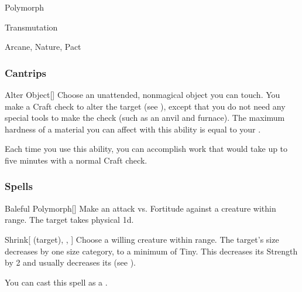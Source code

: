 \newpage
\begin{spellsection}{Polymorph}

\begin{spellheader}
\end{spellheader}


 Transmutation

 Arcane, Nature, Pact

\subsubsection{Cantrips}


\begin{apability}{Alter Object}[]
Choose an unattended, nonmagical object you can touch.
You make a Craft check to alter the target (see ), except that you do not need any special tools to make the check (such as an anvil and furnace).
The maximum hardness of a material you can affect with this ability is equal to your .

Each time you use this ability, you can accomplish work that would take up to five minutes with a normal Craft check.
\end{apability}

\end{spellsection}


\subsubsection{Spells}


\lowercase{\hypertarget{spell:Baleful Polymorph}{}}\label{spell:Baleful Polymorph}
\begin{freeability}[\nth{1}]{\hypertarget{spell:Baleful Polymorph}{Baleful Polymorph}}[]
Make an attack vs. Fortitude against a creature within \rngmed range.
\hit The target takes physical  \plus1d.
\end{freeability}
\vspace{0.25em}



\lowercase{\hypertarget{spell:Shrink}{}}\label{spell:Shrink}
\begin{attuneability}[\nth{1}]{\hypertarget{spell:Shrink}{Shrink}}[ (target), , ]
Choose a willing creature within \rngclose range.
The target's size decreases by one size category, to a minimum of Tiny.
This decreases its Strength by 2 and usually decreases its  (see ).

You can cast this spell as a .
\end{attuneability}
\vspace{0.25em}



